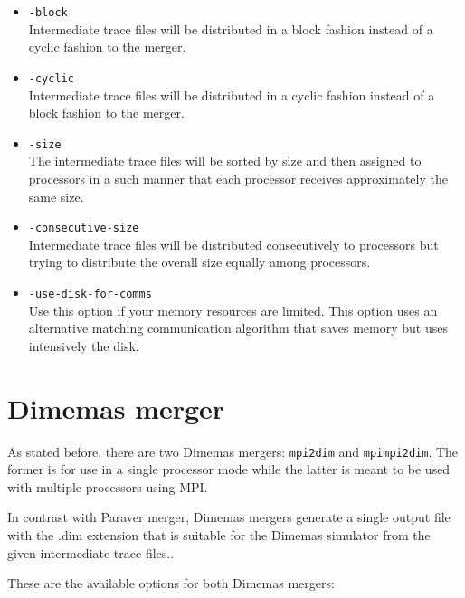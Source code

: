 \begin{itemize}
 \item {\tt -block}\\
  Intermediate trace files will be distributed in a block fashion instead of a cyclic fashion to the merger.
 \item {\tt -cyclic}\\
	Intermediate trace files will be distributed in a cyclic fashion instead of a block fashion to the merger.
 \item {\tt -size}\\
	The intermediate trace files will be sorted by size and then assigned to processors in a such manner that each processor receives approximately the same size.
 \item {\tt -consecutive-size}\\
	Intermediate trace files will be distributed consecutively to processors but trying to distribute the overall size equally among processors.
 \item {\tt -use-disk-for-comms}\\
 Use this option if your memory resources are limited. This option uses an alternative matching communication algorithm that saves memory but uses intensively the disk.
\end{itemize}

\section{Dimemas merger}

As stated before, there are two Dimemas mergers: {\tt mpi2dim} and {\tt mpimpi2dim}. The former is for use in a single processor mode while the latter is meant to be used with multiple processors using MPI.

In contrast with Paraver merger, Dimemas mergers generate a single output file with the .dim extension that is suitable for the Dimemas simulator from the given intermediate trace files..

These are the available options for both Dimemas mergers:

